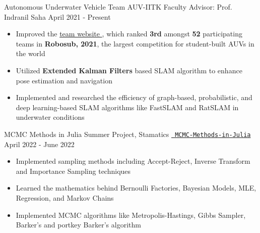\cventry
{Autonomous Underwater Vehicle} %
{Team AUV-IITK} %
{Faculty Advisor: Prof. Indranil Saha} %
{April 2021 - Present} %
{
  \begin{itemize} %
    \item {Improved the \href{https://auv.sntiitk.in/}{team website {\small \faExternalLink{}}}, which ranked \textbf{3rd} amongst \textbf{52} participating teams in \textbf{Robosub, 2021}}, the largest competition for student-built AUVs in the world
    \item Utilized \textbf{Extended Kalman Filters} based SLAM algorithm to enhance pose estimation and navigation
    \item Implemented and researched the efficiency of graph-based, probabilistic, and deep learning-based SLAM algorithms like FastSLAM and RatSLAM in underwater conditions
  \end{itemize}
}
  \cventry
  {MCMC Methods in Julia}
  {Summer Project, Stamatics}
  {\texttt{\href{https://github.com/abhishekshree/mcmc-methods-in-julia}{\faGithub{} MCMC-Methods-in-Julia}}}
  {April 2022 - June 2022}
  {
    \begin{itemize}
      \item Implemented sampling methods including Accept-Reject, Inverse Transform and Importance Sampling techniques
      \item Learned the mathematics behind Bernoulli Factories, Bayesian Models, MLE, Regression, and Markov Chains
      \item Implemented MCMC algorithms like Metropolis-Hastings, Gibbs Sampler, Barker's and portkey Barker’s algorithm
    \end{itemize}
  }
